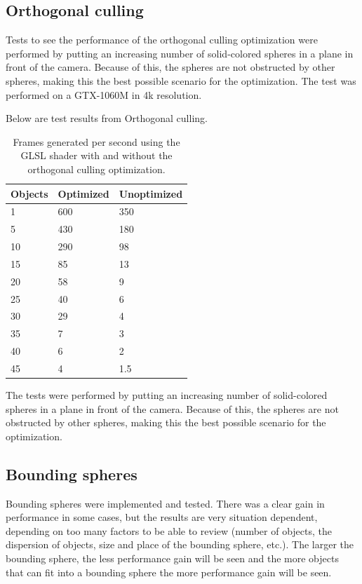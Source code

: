 		\subsection{Orthogonal culling}
		
		Tests to see the performance of the orthogonal culling optimization were
		performed by putting an increasing number of solid-colored spheres in a
		plane in front of the camera. Because of this, the spheres are not
		obstructed by other spheres, making this the best possible scenario for the
		optimization. The test was performed on a GTX-1060M in 4k resolution.

		Below are test results from Orthogonal culling.

			\begin{table}
			\centering
			\begin{tabular}{lll}
				\hline
				Objects & Optimized & Unoptimized \\ 
				\hline
				1       & 600       & 350         \\ 
				5       & 430       & 180         \\			
				10      & 290       & 98          \\
				15      & 85        & 13          \\
				20      & 58        & 9           \\
				25      & 40        & 6           \\
				30      & 29        & 4           \\
				35      & 7         & 3           \\
				40      & 6         & 2           \\
				45      & 4         & 1.5         \\
				\hline
			\end{tabular}
			\caption{Frames generated per second using the GLSL shader with and
				without the orthogonal culling optimization.}
			\end{table}


			The tests were performed by putting an increasing number of
			solid-colored spheres in a plane in front of the camera. Because of
			this, the spheres are not obstructed by other spheres, making this
			the best possible scenario for the optimization.

		\subsection{Bounding spheres}

			Bounding spheres were implemented and tested. There was a clear
			gain in performance in some cases, but the results are very situation dependent, 
			depending on too many factors to be able to review (number of objects, 
			the dispersion of objects, size and place of the bounding sphere, etc.). 
			The larger the bounding sphere, the less performance gain will be seen 
			and the more objects that can fit into a bounding sphere the more performance 
			gain will be seen. 
